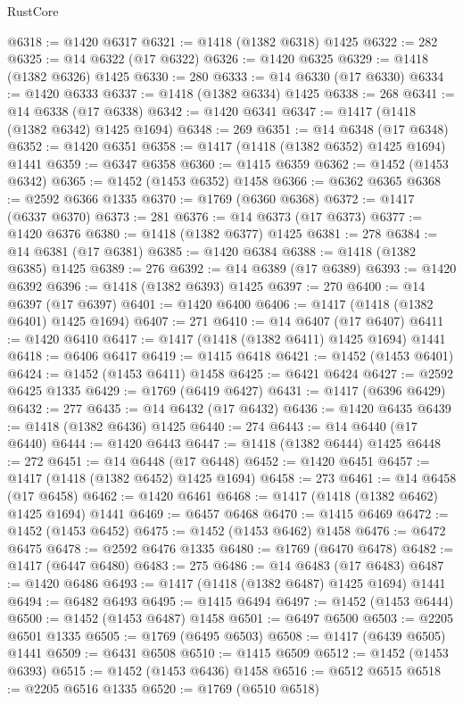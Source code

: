 \begin{lexlean}{RustCore}
\begin{coremodule}
@6318 := @1420 @6317
@6321 := @1418 (@1382 @6318) @1425
@6322 := 282
@6325 := @14 @6322 (@17 @6322)
@6326 := @1420 @6325
@6329 := @1418 (@1382 @6326) @1425
@6330 := 280
@6333 := @14 @6330 (@17 @6330)
@6334 := @1420 @6333
@6337 := @1418 (@1382 @6334) @1425
@6338 := 268
@6341 := @14 @6338 (@17 @6338)
@6342 := @1420 @6341
@6347 := @1417 (@1418 (@1382 @6342) @1425 @1694)
@6348 := 269
@6351 := @14 @6348 (@17 @6348)
@6352 := @1420 @6351
@6358 := @1417 (@1418 (@1382 @6352) @1425 @1694) @1441
@6359 := @6347 @6358
@6360 := @1415 @6359
@6362 := @1452 (@1453 @6342)
@6365 := @1452 (@1453 @6352) @1458
@6366 := @6362 @6365
@6368 := @2592 @6366 @1335
@6370 := @1769 (@6360 @6368)
@6372 := @1417 (@6337 @6370)
@6373 := 281
@6376 := @14 @6373 (@17 @6373)
@6377 := @1420 @6376
@6380 := @1418 (@1382 @6377) @1425
@6381 := 278
@6384 := @14 @6381 (@17 @6381)
@6385 := @1420 @6384
@6388 := @1418 (@1382 @6385) @1425
@6389 := 276
@6392 := @14 @6389 (@17 @6389)
@6393 := @1420 @6392
@6396 := @1418 (@1382 @6393) @1425
@6397 := 270
@6400 := @14 @6397 (@17 @6397)
@6401 := @1420 @6400
@6406 := @1417 (@1418 (@1382 @6401) @1425 @1694)
@6407 := 271
@6410 := @14 @6407 (@17 @6407)
@6411 := @1420 @6410
@6417 := @1417 (@1418 (@1382 @6411) @1425 @1694) @1441
@6418 := @6406 @6417
@6419 := @1415 @6418
@6421 := @1452 (@1453 @6401)
@6424 := @1452 (@1453 @6411) @1458
@6425 := @6421 @6424
@6427 := @2592 @6425 @1335
@6429 := @1769 (@6419 @6427)
@6431 := @1417 (@6396 @6429)
@6432 := 277
@6435 := @14 @6432 (@17 @6432)
@6436 := @1420 @6435
@6439 := @1418 (@1382 @6436) @1425
@6440 := 274
@6443 := @14 @6440 (@17 @6440)
@6444 := @1420 @6443
@6447 := @1418 (@1382 @6444) @1425
@6448 := 272
@6451 := @14 @6448 (@17 @6448)
@6452 := @1420 @6451
@6457 := @1417 (@1418 (@1382 @6452) @1425 @1694)
@6458 := 273
@6461 := @14 @6458 (@17 @6458)
@6462 := @1420 @6461
@6468 := @1417 (@1418 (@1382 @6462) @1425 @1694) @1441
@6469 := @6457 @6468
@6470 := @1415 @6469
@6472 := @1452 (@1453 @6452)
@6475 := @1452 (@1453 @6462) @1458
@6476 := @6472 @6475
@6478 := @2592 @6476 @1335
@6480 := @1769 (@6470 @6478)
@6482 := @1417 (@6447 @6480)
@6483 := 275
@6486 := @14 @6483 (@17 @6483)
@6487 := @1420 @6486
@6493 := @1417 (@1418 (@1382 @6487) @1425 @1694) @1441
@6494 := @6482 @6493
@6495 := @1415 @6494
@6497 := @1452 (@1453 @6444)
@6500 := @1452 (@1453 @6487) @1458
@6501 := @6497 @6500
@6503 := @2205 @6501 @1335
@6505 := @1769 (@6495 @6503)
@6508 := @1417 (@6439 @6505) @1441
@6509 := @6431 @6508
@6510 := @1415 @6509
@6512 := @1452 (@1453 @6393)
@6515 := @1452 (@1453 @6436) @1458
@6516 := @6512 @6515
@6518 := @2205 @6516 @1335
@6520 := @1769 (@6510 @6518)

\end{coremodule}
\end{lexlean}
